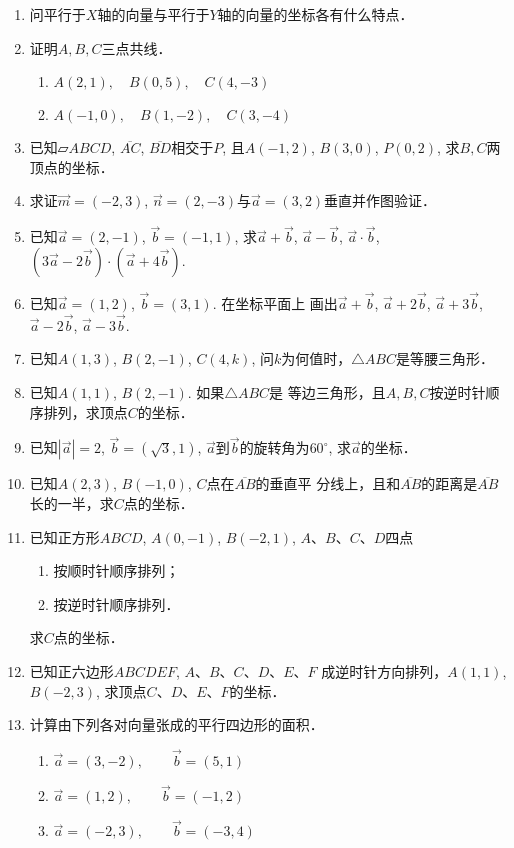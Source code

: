 \begin{enumerate}
\item 问平行于$X$轴的向量与平行于$Y$轴的向量的坐标各有什么特点．
\item 证明$A,B,C$三点共线．
\begin{enumerate}
    \item $A (2, 1) ,\quad  B (0, 5) ,\quad  C (4, -3)$
    \item $A (-1, 0) ,\quad  B (1, -2) ,\quad  C (3, -4)$
\end{enumerate}
\item 已知$\parallelogram{ABCD}$, $\overline{AC}$, $\overline{BD}$相交于$P$, 且$A(-1, 2)$, $B(3, 0)$, $P(0, 2)$, 求$B,C$两顶点的坐标．
\item 求证$\vec{m}=(-2, 3)$, $\vec{n}=(2,-3)$与$\vec{a}=(3, 2)$垂直并作图验证．
\item 已知$\vec{a}=(2,-1)$, $\vec{b}=(-1, 1)$, 求$\vec{a}+\vec{b}$, $\vec{a}-\vec{b}$, $\vec{a}\cdot \vec{b}$, 
$\left(3\vec{a}-2\vec{b}\right)\cdot\left(\vec{a}+4\vec{b}\right)$.
\item 已知$\vec{a}=(1, 2)$, $\vec{b}=(3, 1)$. 在坐标平面上
画出$\vec{a}+\vec{b}$, $\vec{a}+2\vec{b}$, $\vec{a}+3\vec{b}$, $\vec{a}-2\vec{b}$, $\vec{a}-3\vec{b}$.

\item 已知$A(1, 3)$, $B(2,-1)$, $C(4,k)$, 问$k$为何值时，$\triangle ABC$是等腰三角形．
\item 已知$A(1, 1)$, $B(2,-1)$. 如果$\triangle ABC$是
等边三角形，且$A,B,C$按逆时针顺序排列，求顶点$C$的坐标．
\item 已知$|\vec{a}| = 2$, $\vec{b}=(\sqrt{3}, 1)$, $\vec{a}$到$\vec{b}$的旋转角为$60^{\circ}$, 求$\vec{a}$的坐标．
\item 已知$A(2, 3)$, $B(-1, 0)$, $C$点在$\overline{AB}$的垂直平
分线上，且和$\overline{AB}$的距离是$\overline{AB}$长的一半，求$C$点的坐标．
\item 已知正方形$ABCD$, $A(0,-1)$, $B(-2, 1)$, 
$A$、$B$、$C$、$D$四点
\begin{multicols}{2}
\begin{enumerate}
    \item 按顺时针顺序排列；
    \item 按逆时针顺序排列．
\end{enumerate}
\end{multicols}
求$C$点的坐标．
\item 已知正六边形$ABCDEF$, $A$、$B$、$C$、$D$、$E$、$F$
成逆时针方向排列，$A(1, 1)$, $B(-2, 3)$, 求顶点$C$、$D$、$E$、$F$的坐标．
\item 计算由下列各对向量张成的平行四边形的面积．
\begin{enumerate}
    \item $\vec{a}= (3, -2) ,\qquad \vec{b}= (5, 1)$
    \item $\vec{a}= (1, 2) ,\qquad \vec{b}= (-1, 2) $
    \item $\vec{a}= (-2, 3) ,\qquad \vec{b}= (-3, 4) $
\end{enumerate}
\end{enumerate}


